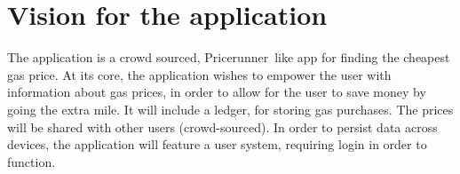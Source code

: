 
\chapter{Vision for the application}
The application is a crowd sourced, Pricerunner\texttrademark\ like app for finding the cheapest gas price. At its core, the application wishes to empower the user with information about gas prices, in order to allow for the user to save money by going the extra mile. It will include a ledger, for storing gas purchases. The prices will be shared with other users (crowd-sourced). In order to persist data across devices, the application will feature a user system, requiring login in order to function.
